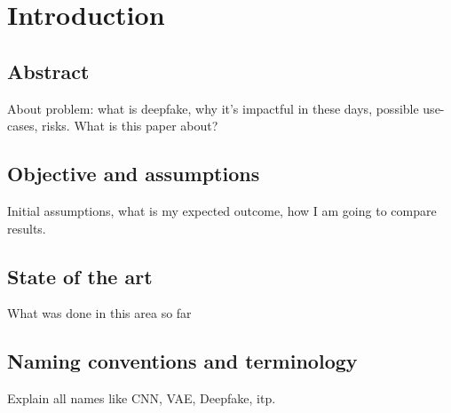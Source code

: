 \chapter{Introduction}
\section{Abstract}
About problem: what is deepfake, why it's impactful in these days, possible use-cases, risks. What is this paper about?

\section{Objective and assumptions}
Initial assumptions, what is my expected outcome, how I am going to compare results.

\section{State of the art}
What was done in this area so far

\section{Naming conventions and terminology}
Explain all names like CNN, VAE, Deepfake, itp.